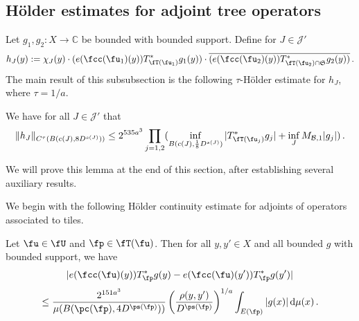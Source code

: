 \subsection{H\"older estimates for adjoint tree operators}
\label{subsubsec-holder-estimates}
    Let $g_1, g_2:X \to \mathbb{C}$ be bounded with bounded support.
    Define for $J \in \mathcal{J}'$
    \begin{equation}
        \label{def-hj}
        h_J(y) := \chi_J(y)\cdot(e(\fcc(\fu_1)(y)) T_{\fT(\fu_1)}^* g_1(y)) \cdot \overline{(e(\fcc(\fu_2)(y)) T_{\fT(\fu_2) \cap \mathfrak{S}}^* g_2(y))}\,.
    \end{equation}
    The main result of this subsubsection is the following $\tau$-H\"older estimate for $h_J$, where $\tau = 1/a$.

    \begin{lemma}
        \label{Holder-correlation-tree}
        \leanok
        We have for all $J \in \mathcal{J}'$ that
      \begin{equation}
            \label{hHolder}
            \|h_J\|_{C^{\tau}(B(c(J), 8D^{s(J)}))} \le 2^{535a^3} \prod_{j = 1,2} (\inf_{B(c(J), \frac{1}{8}D^{s(J)})} |T_{\fT(\fu_j)}^* g_j| + \inf_J M_{\mathcal{B}, 1} |g_j|)\,.
        \end{equation}
    \end{lemma}

    We will prove this lemma at the end of this section, after establishing several auxiliary results.

    We begin with the following H\"older continuity estimate for adjoints of operators associated to tiles.
    \begin{lemma}
        \label{Holder-correlation-tile}
        \leanok
        Let $\fu \in \fU$ and $\fp \in \fT(\fu)$. Then for all $y, y' \in X$ and all bounded $g$ with bounded support, we have
        $$
            |e(\fcc(\fu)(y)) T_{\fp}^* g(y) - e(\fcc(\fu)(y')) T_{\fp}^* g(y')|
        $$
      \begin{equation}
            \label{T*Holder2}
            \le \frac{2^{151a^3}}{\mu(B(\pc(\fp), 4D^{\ps(\fp)}))} \left(\frac{\rho(y, y')}{D^{\ps(\fp)}}\right)^{1/a} \int_{E(\fp)} |g(x)| \, \mathrm{d}\mu(x)\,.
        \end{equation}
    \end{lemma}

